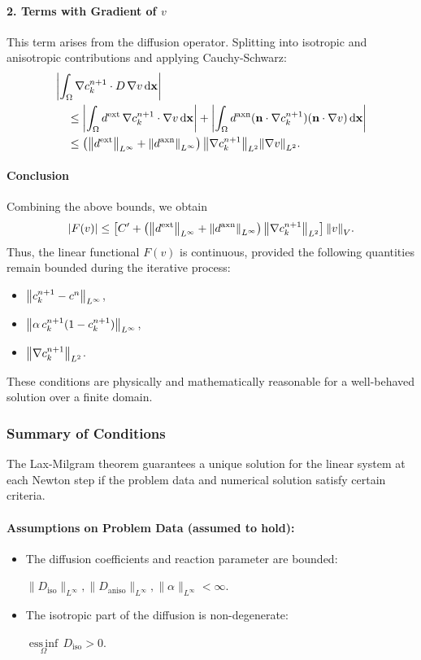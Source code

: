 \documentclass[12pt, a4paper, twoside, openright]{report}
\begin{document}
\paragraph{2. Terms with Gradient of $v$} 
This term arises from the diffusion operator. Splitting into isotropic and anisotropic contributions and applying Cauchy-Schwarz:
\begin{align*}
& \abs{\int_{\Omega} \vb{\nabla} c_k^{n+1} \cdot D \, \vb{\nabla} v \, \dd \vb{x}} \\
&\quad \le \abs{\int_{\Omega} d^{\mathrm{ext}} \, \vb{\nabla} c_k^{n+1} \cdot \vb{\nabla} v \, \dd \vb{x}} 
       + \abs{\int_{\Omega} d^{\mathrm{axn}} (\vb{n} \cdot \vb{\nabla} c_k^{n+1})(\vb{n} \cdot \vb{\nabla} v) \, \dd \vb{x}} \\
&\quad \le \left( \norm{d^{\mathrm{ext}}}_{L^\infty} + \norm{d^{\mathrm{axn}}}_{L^\infty} \right) \norm{\vb{\nabla} c_k^{n+1}}_{L^2} \norm{\vb{\nabla} v}_{L^2}.
\end{align*}

\paragraph{Conclusion} 
Combining the above bounds, we obtain
\[
\abs{F(v)} \le 
\left[ C' + \left( \norm{d^{\mathrm{ext}}}_{L^\infty} + \norm{d^{\mathrm{axn}}}_{L^\infty} \right) \norm{\vb{\nabla} c_k^{n+1}}_{L^2} \right] \norm{v}_V.
\]
Thus, the linear functional $F(v)$ is continuous, provided the following quantities remain bounded during the iterative process:
\begin{itemize}
  \item $\norm{c_k^{n+1} - c^n}_{L^\infty}$,
  \item $\norm{\alpha \, c_k^{n+1} (1 - c_k^{n+1})}_{L^\infty}$,
  \item $\norm{\vb{\nabla} c_k^{n+1}}_{L^2}$.
\end{itemize}
These conditions are physically and mathematically reasonable for a well-behaved solution over a finite domain.

\subsubsection{Summary of Conditions}
The Lax-Milgram theorem guarantees a unique solution for the linear system at each Newton step if the problem data and numerical solution satisfy certain criteria.

\paragraph{Assumptions on Problem Data (assumed to hold):}
\begin{itemize}
  \item The diffusion coefficients and reaction parameter are bounded:

        $\|D_{\text{iso}}\|_{L^\infty}, \|D_{\text{aniso}}\|_{L^\infty}, \|\alpha\|_{L^\infty} < \infty$.
  \item The isotropic part of the diffusion is non-degenerate:

        $\underset{\Omega}{\operatorname{ess\,inf}} \, D_{\text{iso}} > 0$.
\end{itemize}
\end{document}
